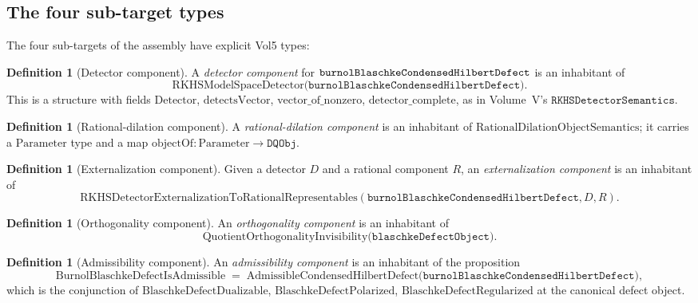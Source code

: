 \documentclass[12pt]{article}
\theoremstyle{plain}
\theoremstyle{definition}
\newtheorem{definition}[theorem]{Definition}
\theoremstyle{remark}
\begin{document}
\subsection{The four sub-target types}
\label{sec:four-subtarget-types}

The four sub-targets of the assembly have explicit Vol5 types:

\begin{definition}[Detector component]
\label{def:detector-component}
A \emph{detector component} for \(\mathtt{burnolBlaschke\-Condensed\-%
Hilbert\-Defect}\) is an inhabitant of
\[
  \mathrm{RKHSModelSpaceDetector}\bigl(\mathtt{burnolBlaschkeCondensedHilbertDefect}\bigr).
\]
This is a structure with fields \(\mathrm{Detector}\),
\(\mathrm{detectsVector}\), \(\mathrm{vector\_of\_nonzero}\),
\(\mathrm{detector\_complete}\), as in Volume~V's
\(\mathtt{RKHSDetectorSemantics}\).
\end{definition}

\begin{definition}[Rational-dilation component]
\label{def:rational-component}
A \emph{rational-dilation component} is an inhabitant of
\(\mathrm{RationalDilationObjectSemantics}\); it carries a
\(\mathrm{Parameter}\) type and a map
\(\mathrm{objectOf} : \mathrm{Parameter} \to \mathtt{DQObj}\).
\end{definition}

\begin{definition}[Externalization component]
\label{def:externalization-component}
Given a detector \(D\) and a rational component \(R\), an
\emph{externalization component} is an inhabitant of
\[
  \mathrm{RKHSDetectorExternalizationToRationalRepresentables}
   (\mathtt{burnolBlaschkeCondensedHilbertDefect}, D, R).
\]
\end{definition}

\begin{definition}[Orthogonality component]
\label{def:orthogonality-component}
An \emph{orthogonality component} is an inhabitant of
\[
  \mathrm{QuotientOrthogonalityInvisibility}\bigl(
    \mathtt{blaschkeDefectObject}\bigr).
\]
\end{definition}

\begin{definition}[Admissibility component]
\label{def:admissibility-component}
An \emph{admissibility component} is an inhabitant of the proposition
\[
  \mathrm{BurnolBlaschkeDefectIsAdmissible} \;=\;
  \mathrm{AdmissibleCondensedHilbertDefect}\bigl(
    \mathtt{burnolBlaschkeCondensedHilbertDefect}\bigr),
\]
which is the conjunction of
\(\mathrm{BlaschkeDefectDualizable}\),
\(\mathrm{BlaschkeDefectPolarized}\),
\(\mathrm{BlaschkeDefectRegularized}\) at the canonical defect object.
\end{definition}
\end{document}
